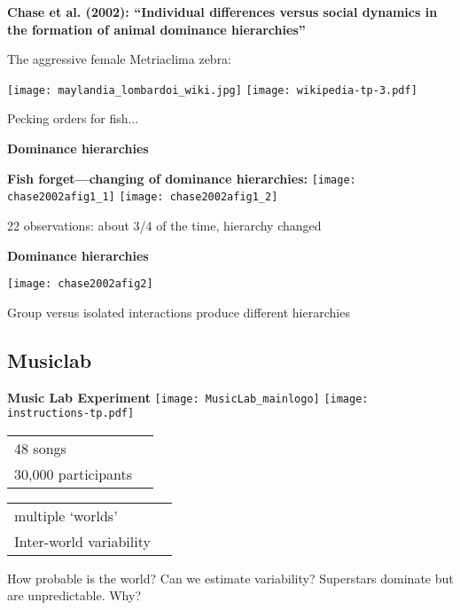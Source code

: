   \textbf{Chase et al. (2002): \alert{``Individual differences versus social dynamics in the formation of animal dominance hierarchies''}\cite{chase2002a}}
    
     
      The aggressive female Metriaclima zebra:
    
    \begin{center}
      \texttt{[image: maylandia\_lombardoi\_wiki.jpg]}
      \texttt{[image: wikipedia-tp-3.pdf]}
    \end{center}
    
     
      Pecking orders for fish... 
    
  
  

  \textbf{Dominance hierarchies}

  \textbf{Fish forget---changing of dominance hierarchies:}
    \texttt{[image: chase2002afig1\_1]}%
    \texttt{[image: chase2002afig1\_2]}%
    
    22 observations: about 3/4 of the time, hierarchy changed
    
  
  

  \textbf{Dominance hierarchies}

  \texttt{[image: chase2002afig2]}%

  
    
    Group versus isolated interactions produce different hierarchies
    
  
  


\subsection{Musiclab}

  \textbf{Music Lab Experiment}
  \texttt{[image: MusicLab\_mainlogo]}%
  \hfill
  \texttt{[image: instructions-tp.pdf]}

  \begin{tabular}{ll}
    48 songs \\
    30,000 participants\\    %
  \end{tabular}
  \hfill
  \begin{tabular}{ll}
    multiple `worlds'\\
    Inter-world variability\\
  \end{tabular}

  
   How probable is the world?  
   Can we estimate variability?
   Superstars dominate but are unpredictable.  Why?
  



